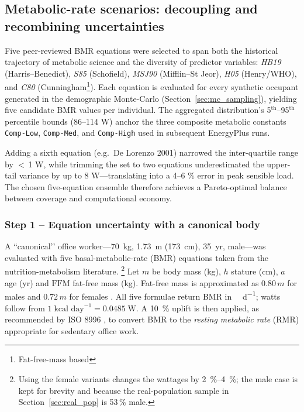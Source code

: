 \subsection{Metabolic-rate scenarios: decoupling and recombining uncertainties}
\label{sec:met_scenarios}
Five peer-reviewed BMR equations were selected to span both the historical trajectory of metabolic science and the diversity of predictor variables: \emph{HB19} (Harris–Benedict), \emph{S85} (Schofield), \emph{MSJ90} (Mifflin–St Jeor), \emph{H05} (Henry/WHO), and \emph{C80} (Cunningham\footnote{Fat-free-mass based}). Each equation is evaluated for every synthetic occupant generated in the demographic Monte-Carlo (Section~\ref{sec:mc_sampling}), yielding five candidate BMR values per individual. The aggregated distribution’s 5$^{\mathrm{th}}$–95$^{\mathrm{th}}$ percentile bounds (86–114 W) anchor the three composite metabolic constants \texttt{Comp-Low}, \texttt{Comp-Med}, and \texttt{Comp-High} used in subsequent EnergyPlus runs.

Adding a sixth equation (e.g.\ De Lorenzo 2001) narrowed the inter-quartile range by $<\,$1 W, while trimming the set to two equations underestimated the upper-tail variance by up to 8 W—translating into a 4–6 \% error in peak sensible load. The chosen five-equation ensemble therefore achieves a Pareto-optimal balance between coverage and computational economy. %

\subsubsection{Step 1 – Equation uncertainty with a canonical body}
\label{sec:eq_uncertainty}

A ``canonical’’ office worker---\SI{70}{kg}, \SI{1.73}{m} (\SI{173}{cm}),
\SI{35}{yr}, male---was evaluated with five basal-metabolic-rate (BMR)
equations taken from the nutrition-metabolism literature.%
\footnote{Using the female variants changes the wattages by
\SIrange[round-precision=0]{2}{4}{\percent}; the male case
is kept for brevity and because the real-population sample in
Section~\ref{sec:real_pop} is 53\,\% male.}
Let $m$ be body mass (kg), $h$ stature (cm), $a$ age (yr) and
$\mathrm{FFM}$ fat-free mass (kg).  Fat-free mass is approximated as
$0.80\,m$ for males and $0.72\,m$ for females \citep{Gallagher2000}.  
All five formulae return BMR in \si{\kilo\cal\per\day}; watts follow from
$1\;\text{kcal day}^{-1}=0.0485\;\text{W}$.  A \SI{10}{\percent} uplift is then
applied, as recommended by ISO 8996 \citep{ISO8996_2021}, to convert BMR to the
\emph{resting metabolic rate} (RMR) appropriate for sedentary office work.


